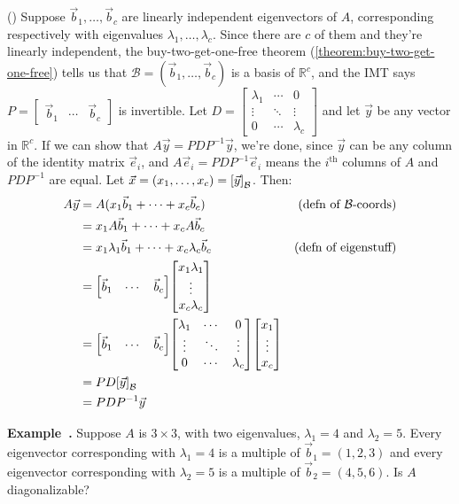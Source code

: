 \documentclass[11pt, letterpaper]{report}
\newenvironment{book}{}{}
\let\originalleft\left
\let\originalright\right
\renewcommand{\left}{\mathopen{}\mathclose\bgroup\originalleft}
\renewcommand{\right}{\aftergroup\egroup\originalright}
\newcounter{example}[section]
\newcommand{\example}{\refstepcounter{example}%
\par\noindent\textbf{Example~\theexample.} }
\newcounter{theorem}[chapter]
\newcommand{\R}{\mathbb{R}}
\newcommand{\bbbvec}[3]{
  \begin{bmatrix} #1 \\ #2 \\ #3 \end{bmatrix}
}
\begin{document}
\begin{book}
(\leftarrow) Suppose $\vec{b}_1,\ldots,\vec{b}_c$ are linearly independent eigenvectors of $A$, corresponding respectively with eigenvalues $\lambda_1,\ldots,\lambda_c$. Since there are $c$ of them and they're linearly independent, the buy-two-get-one-free theorem (\ref{theorem:buy-two-get-one-free}) tells us that $\mathcal{B}=( \vec{b}_1,\ldots,\vec{b}_c )$ is a basis of $\R^c$, and the IMT says $P = \begin{bmatrix}
\vec{b}_1 & \cdots & \vec{b}_c
\end{bmatrix}$ is invertible. Let $D = \begin{bmatrix}
\lambda_1 & \cdots & 0 \\
\vdots & \ddots & \vdots \\
0 & \cdots & \lambda_c
\end{bmatrix}$ and let $\vec{y}$ be any vector in $\R^c$. If we can show that $A\vec{y}=PDP^{-1}\vec{y}$, we're done, since $\vec{y}$ can be any column of the identity matrix $\vec{e}_i$, and $A\vec{e}_i = PDP^{-1}\vec{e}_i$ means the $i^{\text{th}}$ columns of $A$ and $PDP^{-1}$ are equal. Let $\vec{x} = (x_1,\ldots,x_c) = \left[ \vec{y} \right]_{\mathcal{B}}$. Then:
\begin{align*}
A\vec{y} &= A ( x_1\vec{b}_1 + \cdots + x_c\vec{b}_c ) & (\text{defn of } \mathcal{B}\text{-coords})\\
&= x_1A\vec{b}_1 + \cdots + x_cA\vec{b}_c \\
&= x_1\lambda_1 \vec{b}_1 + \cdots + x_c\lambda_c \vec{b}_c & (\text{defn of eigenstuff})\\
&= \begin{bmatrix}
\vec{b}_1 & \cdots & \vec{b}_c
\end{bmatrix}\bbbvec{x_1\lambda_1}{\vdots}{x_c\lambda_c} \\
&= \begin{bmatrix}
\vec{b}_1 & \cdots & \vec{b}_c
\end{bmatrix}\begin{bmatrix}
\lambda_1 & \cdots & 0 \\
\vdots & \ddots & \vdots \\
0 & \cdots & \lambda_c
\end{bmatrix} \bbbvec{x_1}{\vdots}{x_c} \\ 
&= PD \left[ \vec{y} \right]_{\mathcal{B}} \\
&= PDP^{-1}\vec{y}
\end{align*}
\blacksquare
\end{book}

\example Suppose $A$ is $3\times3$, with two eigenvalues, $\lambda_1=4$ and $\lambda_2=5$. Every eigenvector corresponding with $\lambda_1 = 4$ is a multiple of $\vec{b}_1=(1,2,3)$ and every eigenvector corresponding with $\lambda_2=5$ is a multiple of $\vec{b}_2=(4,5,6)$. Is $A$ diagonalizable?   
\end{document}
